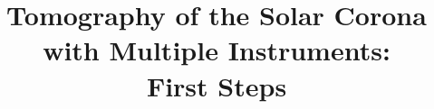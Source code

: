 \documentclass[baaa]{baaa}
\begin{document}



\title{Tomography of the Solar Corona with Multiple Instruments:\\ First Steps}
\subtitle{}

\end{document}
